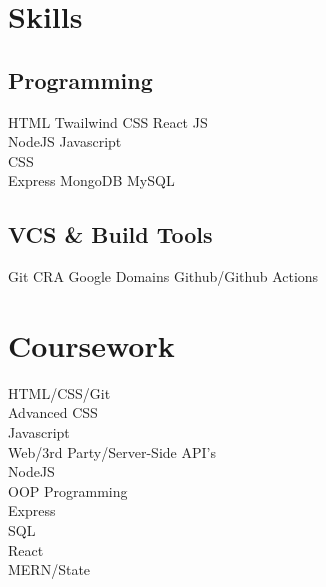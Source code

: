 \documentclass[]{deedy-resume-openfont}
\begin{document}
\begin{minipage}[t]{0.33\textwidth} 


\section{Skills}
\subsection{Programming}
HTML \textbullet{} Twailwind CSS \textbullet{} React JS \ \\ 
NodeJS \textbullet{} Javascript \\
\textbullet{} CSS \\
Express \textbullet{}
MongoDB \textbullet{ }MySQL 
\subsection{VCS \& Build Tools}
Git \textbullet{} CRA \textbullet{}Google Domains \textbullet{} Github/Github Actions
\sectionsep



\section{Coursework}
HTML/CSS/Git \\
Advanced CSS \\
Javascript \\
Web/3rd Party/Server-Side API's \\
NodeJS \\
OOP Programming \\
Express \\
SQL \\
React \\
MERN/State \\
 

\end{minipage}%
\end{document}
